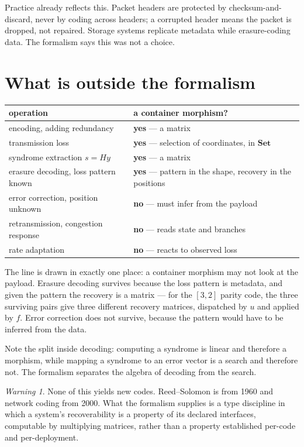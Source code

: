 \documentclass[11pt,a4paper]{article}
\theoremstyle{definition}
\theoremstyle{remark}
\newtheorem{warning}[theorem]{Warning}
\newcommand{\cat}[1]{\mathbf{#1}}
\newcommand{\Set}{\cat{Set}}
\begin{document}
Practice already reflects this. Packet headers are protected by checksum-and-discard,
never by coding across headers; a corrupted header means the packet is dropped, not
repaired. Storage systems replicate metadata while erasure-coding data. The formalism
says this was not a choice.

\section{What is outside the formalism}\label{sec:whatsoutside}

\begin{center}
\small
\setlength{\tabcolsep}{6pt}
\begin{tabular}{ll}
\toprule
operation & a container morphism? \\
\midrule
encoding, adding redundancy & \textbf{yes} --- a matrix \\
transmission loss & \textbf{yes} --- selection of coordinates, in $\Set$ \\
syndrome extraction $s = Hy$ & \textbf{yes} --- a matrix \\
erasure decoding, loss pattern known & \textbf{yes} --- pattern in the shape, recovery in the positions \\
error correction, position unknown & \textbf{no} --- must infer from the payload \\
retransmission, congestion response & \textbf{no} --- reads state and branches \\
rate adaptation & \textbf{no} --- reacts to observed loss \\
\bottomrule
\end{tabular}
\end{center}

The line is drawn in exactly one place: a container morphism may not look at the
payload. Erasure decoding survives because the loss pattern is metadata, and given the
pattern the recovery is a matrix --- for the $[3,2]$ parity code, the three surviving
pairs give three different recovery matrices, dispatched by $u$ and applied by $f$.
Error correction does not survive, because the pattern would have to be inferred from
the data.

Note the split inside decoding: computing a syndrome is linear and therefore a
morphism, while mapping a syndrome to an error vector is a search and therefore not.
The formalism separates the algebra of decoding from the search.

\begin{warning}
None of this yields new codes. Reed--Solomon is from 1960 and network coding from
2000. What the formalism supplies is a type discipline in which a system's
recoverability is a property of its declared interfaces, computable by multiplying
matrices, rather than a property established per-code and per-deployment.
\end{warning}
\end{document}
